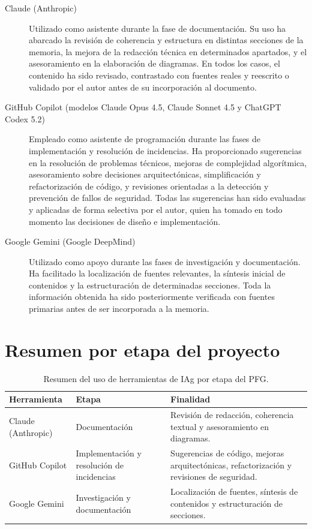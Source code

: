 \documentclass{memoriaPFC}
\begin{document}
\begin{description}

  \item[Claude (Anthropic)] Utilizado como asistente durante la fase de documentación.
  Su uso ha abarcado la revisión de coherencia y estructura en distintas secciones de la
  memoria, la mejora de la redacción técnica en determinados apartados, y el asesoramiento
  en la elaboración de diagramas. En todos los casos, el contenido ha sido revisado,
  contrastado con fuentes reales y reescrito o validado por el autor antes de su
  incorporación al documento.

  \item[GitHub Copilot (modelos Claude Opus 4.5, Claude Sonnet 4.5 y ChatGPT Codex 5.2)]
  Empleado como asistente de programación durante las fases de implementación y resolución
  de incidencias. Ha proporcionado sugerencias en la resolución de problemas técnicos,
  mejoras de complejidad algorítmica, asesoramiento sobre decisiones arquitectónicas,
  simplificación y refactorización de código, y revisiones orientadas a la detección y
  prevención de fallos de seguridad. Todas las sugerencias han sido evaluadas y aplicadas
  de forma selectiva por el autor, quien ha tomado en todo momento las decisiones de diseño
  e implementación.

  \item[Google Gemini (Google DeepMind)] Utilizado como apoyo durante las fases de
  investigación y documentación. Ha facilitado la localización de fuentes relevantes,
  la síntesis inicial de contenidos y la estructuración de determinadas secciones.
  Toda la información obtenida ha sido posteriormente verificada con fuentes primarias
  antes de ser incorporada a la memoria.
  
\end{description}

\section*{Resumen por etapa del proyecto}

\begin{table}[H]
\centering
\begin{tabular}{p{3.5cm} p{3.5cm} p{6cm}}
\toprule
\textbf{Herramienta} & \textbf{Etapa} & \textbf{Finalidad} \\
\midrule
Claude (Anthropic)
  & Documentación
  & Revisión de redacción, coherencia textual y asesoramiento en diagramas. \\
\addlinespace
GitHub Copilot
  & Implementación y resolución de incidencias
  & Sugerencias de código, mejoras arquitectónicas, refactorización y revisiones de seguridad. \\
\addlinespace
Google Gemini
  & Investigación y documentación
  & Localización de fuentes, síntesis de contenidos y estructuración de secciones. \\
\bottomrule
\end{tabular}
\caption{Resumen del uso de herramientas de IAg por etapa del PFG.}
\label{tab:uso-ia}
\end{table}
\end{document}
